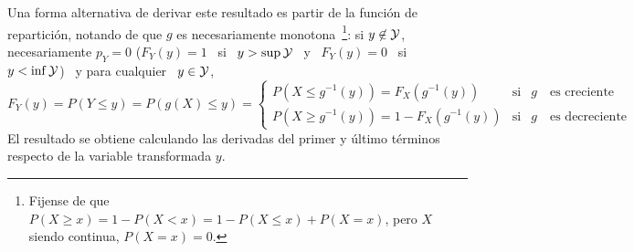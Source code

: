 Una forma  alternativa de derivar  este resultado es  partir de la  funci\'on de
repartici\'on, notando  de que $g$  es necesariamente monotona~\footnote{Fijense
  de que  $P(X \ge x) =  1 - P(X <  x) = 1  - P(X \le x)  + P(X = x)$,  pero $X$
  siendo continua, $ P(X  = x) = 0$.}: si $y \not\in  \mathcal{Y}$, necesariamente $p_Y =
0$ ($F_Y(y) = 1$ \ si \ $y > \sup \mathcal{Y}$ \ y \ $F_Y(y) = 0$ \ si \ $y < \inf \mathcal{Y}$) \
y para cualquier \ $y \in \mathcal{Y}$,
%
\[
F_Y(y) = P(Y \le y) = P(g(X) \le y) =
\left\{\begin{array}{lll}
P(X \le g^{-1}(y)) = F_X(g^{-1}(y)) & \mbox{si} & g \quad \mbox{es creciente}\\[2.5mm]
%
P(X \ge g^{-1}(y)) = 1 - F_X(g^{-1}(y)) & \mbox{si} & g \quad \mbox{es decreciente}
\end{array}\right.
\]
%
El  resultado  se  obtiene  calculando  las  derivadas  del  primer  y  \'ultimo
t\'erminos respecto de la variable transformada $y$.

